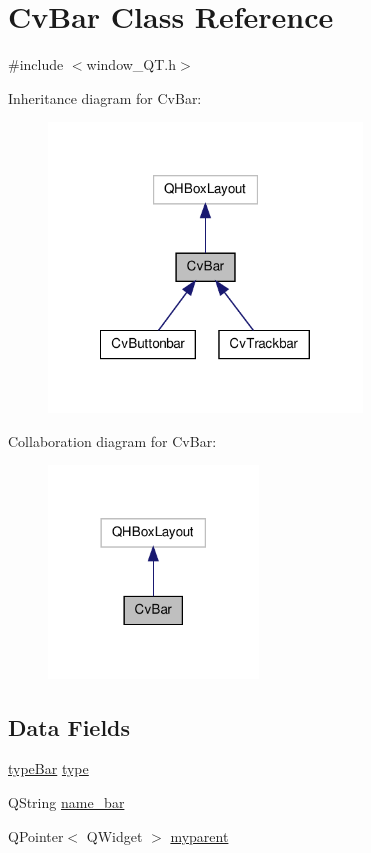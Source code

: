 \hypertarget{classCvBar}{\section{Cv\-Bar Class Reference}
\label{classCvBar}
}


{\ttfamily \#include $<$window\-\_\-\-Q\-T.\-h$>$}



Inheritance diagram for Cv\-Bar\-:\nopagebreak
\begin{figure}[H]
\begin{center}
\leavevmode
\includegraphics[width=236pt]{classCvBar__inherit__graph}
\end{center}
\end{figure}


Collaboration diagram for Cv\-Bar\-:\nopagebreak
\begin{figure}[H]
\begin{center}
\leavevmode
\includegraphics[width=158pt]{classCvBar__coll__graph}
\end{center}
\end{figure}
\subsection*{Data Fields}
\begin{DoxyCompactItemize}
\item 
\hyperlink{window__QT_8h_a4003d2816fd898b0f71eb5addfe80af3}{type\-Bar} \hyperlink{classCvBar_a64329aa3255c2c98a36f3f887a939b40}{type}
\item 
Q\-String \hyperlink{classCvBar_a6970f0eae76786143e2df415681d0a6f}{name\-\_\-bar}
\item 
Q\-Pointer$<$ Q\-Widget $>$ \hyperlink{classCvBar_af6fa35b8c9f4aed557854fc3aa80a040}{myparent}
\end{DoxyCompactItemize}


